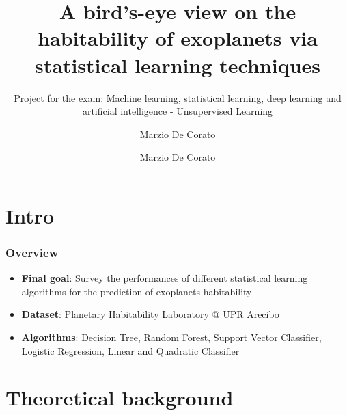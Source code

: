 \documentclass[compress]{beamer}
\author{Marzio De Corato}
\title[Exoplanets survey via SL techniques]{A bird’s-eye view on the habitability of exoplanets via statistical learning techniques}
\author{}
\date{}
\subtitle{Project for the exam: Machine learning, statistical
learning, deep learning and artificial intelligence - Unsupervised Learning}
\begin{document}
\frame{\vspace{+4.5cm}\titlepage}

\usebackgroundtemplate{ } 

\author{Marzio De Corato}

\section{Intro}

\begin{frame}
\frametitle{Overview}
\begin{itemize}
\item\textbf{Final goal}: Survey the performances of different statistical learning algorithms for the prediction of exoplanets habitability
\item\textbf{Dataset}: Planetary Habitability Laboratory @ UPR Arecibo \cite{planet_dataset}
\item\textbf{Algorithms}: Decision Tree, Random Forest, Support Vector Classifier, Logistic Regression, Linear and Quadratic Classifier
\end{itemize}
\end{frame}

\section{Theoretical background}
\end{document}

